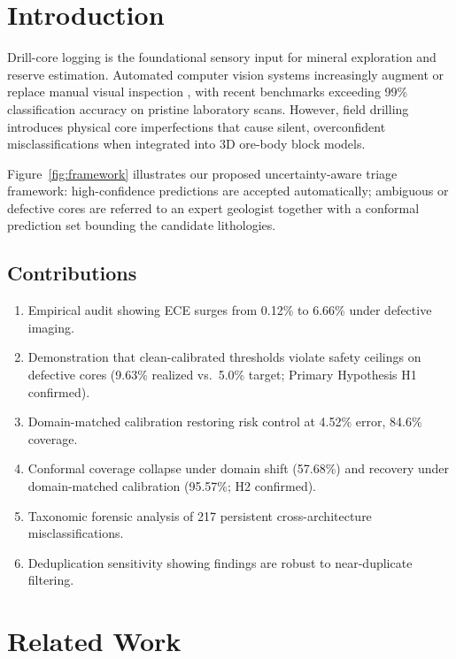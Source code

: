 \documentclass[5p,times,twocolumn]{elsarticle}
\begin{document}
\section{Introduction}
\label{sec:intro}

Drill-core logging is the foundational sensory input for mineral exploration and reserve
estimation.
Automated computer vision systems increasingly augment or replace manual visual inspection
\citep{Li2025DCID,Serdoun2026Weakly}, with recent benchmarks exceeding 99\% classification
accuracy on pristine laboratory scans.
However, field drilling introduces physical core imperfections that cause silent,
overconfident misclassifications when integrated into 3D ore-body block models.

Figure~\ref{fig:framework} illustrates our proposed uncertainty-aware triage framework:
high-confidence predictions are accepted automatically; ambiguous or defective cores are
referred to an expert geologist together with a conformal prediction set bounding the
candidate lithologies.

\subsection*{Contributions}
\begin{enumerate}
  \item Empirical audit showing ECE surges from 0.12\% to 6.66\% under defective imaging.
  \item Demonstration that clean-calibrated thresholds violate safety ceilings on defective
        cores (9.63\% realized vs.\ 5.0\% target; Primary Hypothesis H1 confirmed).
  \item Domain-matched calibration restoring risk control at 4.52\% error, 84.6\% coverage.
  \item Conformal coverage collapse under domain shift (57.68\%) and recovery under
        domain-matched calibration (95.57\%; H2 confirmed).
  \item Taxonomic forensic analysis of 217 persistent cross-architecture misclassifications.
  \item Deduplication sensitivity showing findings are robust to near-duplicate filtering.
\end{enumerate}

\section{Related Work}
\label{sec:related}
\end{document}
